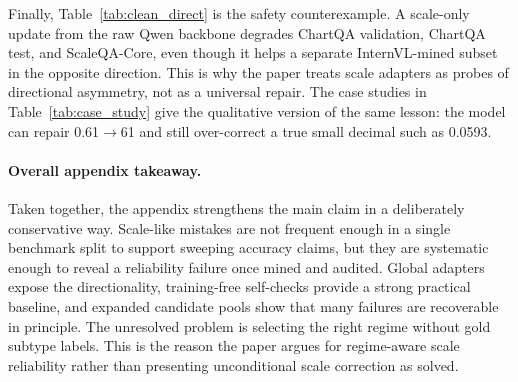 \begin{table}[h]
\centering
\small
\resizebox{\linewidth}{!}{}
\caption{Fine-grained taxonomy of the image-evaluable ScaleQA-Natural subset. Counts summarize question patterns and unit evidence; categories are not mutually exclusive across the two blocks.}
\label{tab:fine_taxonomy}
\end{table}

\begin{table}[h]
\centering
\small
\resizebox{\linewidth}{!}{}
\caption{Clean direct scale-only adaptation from the raw Qwen2.5-VL-7B backbone.}
\label{tab:clean_direct}
\end{table}

Finally, Table~\ref{tab:clean_direct} is the safety counterexample. A scale-only update from the raw Qwen backbone degrades ChartQA validation, ChartQA test, and ScaleQA-Core, even though it helps a separate InternVL-mined subset in the opposite direction. This is why the paper treats scale adapters as probes of directional asymmetry, not as a universal repair. The case studies in Table~\ref{tab:case_study} give the qualitative version of the same lesson: the model can repair 0.61$\rightarrow$61 and still over-correct a true small decimal such as 0.0593.

\begin{table}[h]
\centering
\small

\caption{Representative recoveries and an over-correction failure.}
\label{tab:case_study}
\end{table}

\paragraph{Overall appendix takeaway.}
Taken together, the appendix strengthens the main claim in a deliberately conservative way. Scale-like mistakes are not frequent enough in a single benchmark split to support sweeping accuracy claims, but they are systematic enough to reveal a reliability failure once mined and audited. Global adapters expose the directionality, training-free self-checks provide a strong practical baseline, and expanded candidate pools show that many failures are recoverable in principle. The unresolved problem is selecting the right regime without gold subtype labels. This is the reason the paper argues for regime-aware scale reliability rather than presenting unconditional scale correction as solved.


